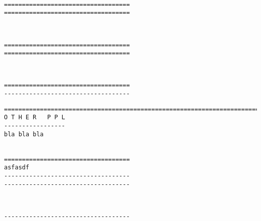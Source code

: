 \

\goodbreak \begin{samepage} \small \begin{verbatim}
===================================
===================================
\end{verbatim} \normalsize \end{samepage}

\

\goodbreak \begin{samepage} \small \begin{verbatim}
===================================
===================================
\end{verbatim} \normalsize \end{samepage}

\

\goodbreak \begin{samepage} \small \begin{verbatim}
===================================
-----------------------------------
\end{verbatim} \normalsize \end{samepage}






\goodbreak
{}

\goodbreak \begin{samepage} \small \begin{verbatim}
================================================================================
O T H E R   P P L
-----------------
bla bla bla


===================================
asfasdf
-----------------------------------
-----------------------------------
\end{verbatim} \normalsize \end{samepage}

\

\goodbreak \begin{samepage} \small \begin{verbatim}
-----------------------------------
\end{verbatim} \normalsize \end{samepage}

\

